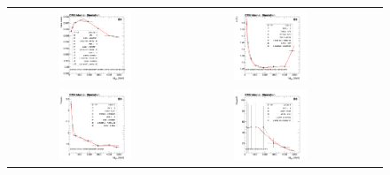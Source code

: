 \begin{figure}[ht]
  \begin{center}
    \begin{tabular}{cccc}
      \includegraphics[width=0.45\textwidth]{figures/Zprime/2017/mass_resolution/High_Mass/BB_mean} &
      \includegraphics[width=0.45\textwidth]{figures/Zprime/2017/mass_resolution/High_Mass/BB_sigma}\\
      \includegraphics[width=0.45\textwidth]{figures/Zprime/2017/mass_resolution/High_Mass/BB_PowerL} &
      \includegraphics[width=0.45\textwidth]{figures/Zprime/2017/mass_resolution/High_Mass/BB_PowerR} \\

\end{tabular}
\end{center}
\end{figure}
